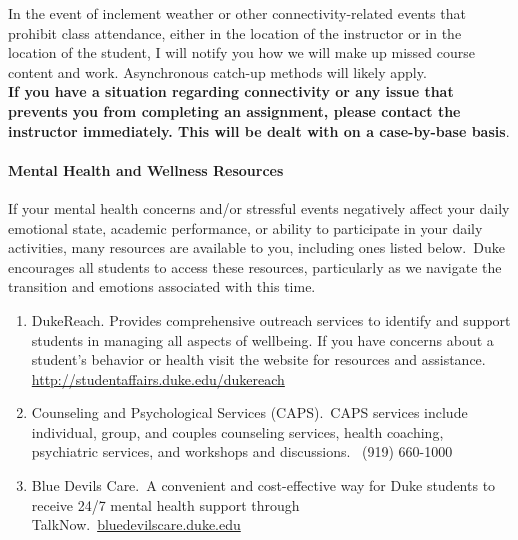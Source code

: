 \documentclass[11pt]{article}
\begin{document}
In the event of inclement weather or other connectivity-related events that prohibit class attendance, either in the location of the instructor or in the location of the student, I will notify you how we will make up missed course content and work.  Asynchronous catch-up methods will likely apply.\\

\textbf{If you have a situation regarding connectivity or any issue that prevents you from completing an assignment, please contact the instructor immediately. This will be dealt with on a case-by-base basis}. \\




\paragraph{Mental Health and Wellness Resources}

If your mental health concerns and/or stressful events negatively affect your daily emotional state, academic performance, or ability to participate in your daily activities, many resources are available to you, including ones listed below. Duke encourages all students to access these resources, particularly as we navigate the transition and emotions associated with this time. 


\begin{enumerate}
\item DukeReach. Provides comprehensive outreach services to identify and support students in managing all aspects of wellbeing. If you have concerns about a student's behavior or health visit the website for resources and assistance. \url{http://studentaffairs.duke.edu/dukereach}
\item Counseling and Psychological Services (CAPS). CAPS services include individual, group, and couples counseling services, health coaching, psychiatric services, and workshops and discussions.  (919) 660-1000
\item Blue Devils Care. A convenient and cost-effective way for Duke students to receive 24/7 mental health support through TalkNow. \url{bluedevilscare.duke.edu}
\end{enumerate}
\end{document}
